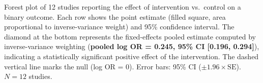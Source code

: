 \caption{Forest plot of 12 studies reporting the effect of intervention vs.\ control on a binary outcome. Each row shows the point estimate (filled square, area proportional to inverse-variance weight) and 95\% confidence interval. The diamond at the bottom represents the fixed-effects pooled estimate computed by inverse-variance weighting (\textbf{pooled log OR = 0.245, 95\% CI [0.196, 0.294]}), indicating a statistically significant positive effect of the intervention. The dashed vertical line marks the null (log OR = 0). Error bars: 95\% CI ($\pm 1.96 \times \mathrm{SE}$). $N = 12$ studies.}
